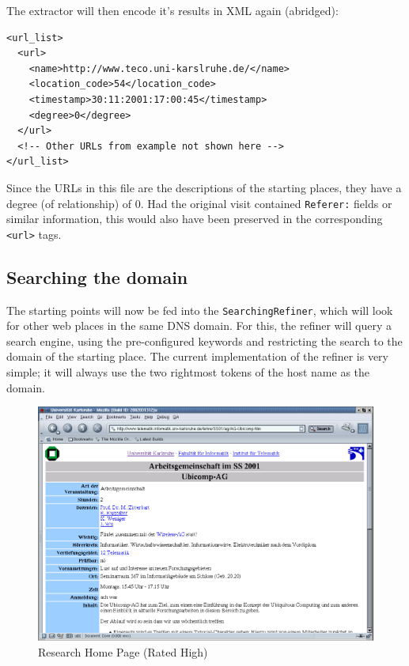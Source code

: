 \documentclass[a4paper]{danarticle}
\theoremstyle{remark}
\begin{document}
      The extractor will then encode it's results in XML again (abridged):
      \begin{verbatim}
<url_list>
  <url> 
    <name>http://www.teco.uni-karslruhe.de/</name> 
    <location_code>54</location_code> 
    <timestamp>30:11:2001:17:00:45</timestamp> 
    <degree>0</degree> 
  </url> 
  <!-- Other URLs from example not shown here --> 
</url_list>
      \end{verbatim}
      Since the URLs in this file are the descriptions of the starting places,
      they have a degree (of relationship) of 0. Had the original visit
      contained
      \verb$Referer:$  fields or similar information, this would also have been
      preserved in the corresponding \verb$<url>$ tags.
    \subsection{Searching the domain}
      The starting points will now be fed into the \verb$SearchingRefiner$,
      which will look for other web places in the same DNS domain. For this, the
      refiner will query a search engine, using the pre-configured keywords and
      restricting the search to the domain of the starting place. The current
      implementation of the refiner is very simple; it will always use the two
      rightmost tokens of the host name as the domain. 
      
      
      
      \begin{figure}[ht]
        \centering
        \includegraphics[width=12cm]{ubicompag}
        \caption{Research Home Page (Rated High)}
        \label{ubicompag}
      \end{figure}
      
\end{document}
